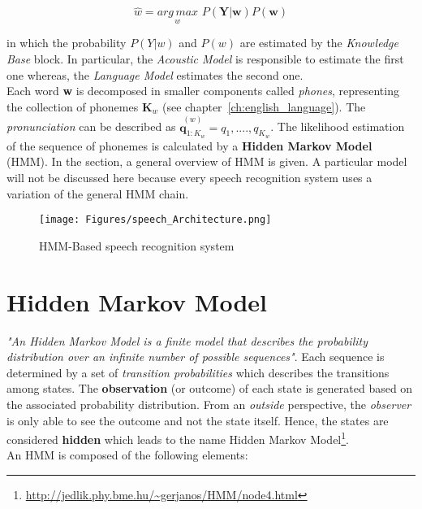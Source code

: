 \begin{equation}
	\widehat{w} = \underset{w}{arg \, max} \,\, P (\textbf{Y}|\textbf{w}) P(\textbf{w})
\end{equation}

\noindent in which the probability $P(Y|w)$ and $P(w)$ are estimated by the \textit{Knowledge Base} block. In particular, the \textit{Acoustic Model} is responsible to estimate the first one whereas, the \textit{Language Model} estimates the second one. \\
\noindent Each word \textbf{w} is decomposed in smaller components called \textit{phones}, representing the collection of phonemes $\textbf{K}_{w}$ (see chapter~\ref{ch:english_language}). The \textit{pronunciation} can be described as $\overset{(w)}{\textbf{q}_{1:K_{w}}} = q_{1}, ...., q_{K_{w}}$. The likelihood estimation of the sequence of phonemes is calculated by a \textbf{Hidden Markov Model} (HMM). In the section, a general overview of HMM is given. A particular model will not be discussed here because every speech recognition system uses a variation of the general HMM chain. \\

\begin{figure}[!ht]
	\centering
	\texttt{[image: Figures/speech\_Architecture.png]}
	\caption{HMM-Based speech recognition system \cite{gales2008application}}
	\label{fig:speech_architecture}
\end{figure}

\section{Hidden Markov Model}
\label{sec:hmm}
\noindent \textit{"An Hidden Markov Model is a finite model that describes the probability distribution over an infinite number of possible sequences"}\cite{eddy1996hidden}. Each sequence is determined by a set of \textit{transition probabilities} which describes the transitions among states. The \textbf{observation} (or outcome) of each state is generated based on the associated probability distribution. From an \textit{outside} perspective, the \textit{observer} is only able to see the outcome and not the state itself. Hence, the states are considered \textbf{hidden} which leads to the name Hidden Markov Model\footnote{\url{http://jedlik.phy.bme.hu/~gerjanos/HMM/node4.html}}\cite{rabiner1986introduction}. \\

\noindent An HMM is composed of the following elements:

